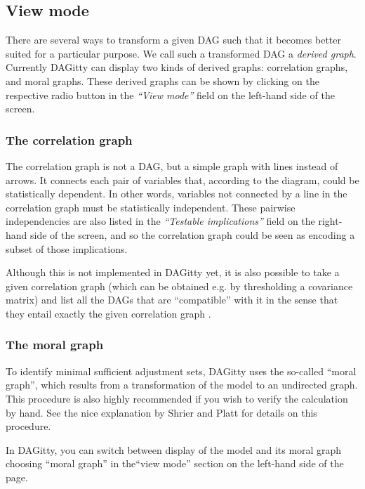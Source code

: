 \documentclass[a4paper]{article} %
\newcommand{\pp}{{\sc DAG}itty\xspace}
\newcommand{\action}[1]{\emph{``#1''}}
\begin{document}
\subsection{View mode}

There are several ways to transform a given DAG such that it becomes better suited for 
a particular purpose. We call such a transformed DAG a \emph{derived graph}. Currently
\pp can display two kinds of derived graphs: correlation graphs, and moral graphs.
These derived graphs can be shown by clicking on the respective radio button in the
\action{View mode} field on the left-hand side of the screen. 

\subsubsection{The correlation graph}

The correlation graph is not a DAG, but a simple graph with lines instead of arrows. 
It connects each pair of variables that, according to the diagram, could be statistically
dependent. In other words, variables not connected by a line in the correlation graph
must be statistically independent. These pairwise independencies are also listed in the
\action{Testable implications} field on the right-hand side of the screen, and so the
correlation graph could be seen as encoding a subset of those implications. 

Although this is not implemented in \pp yet, it is also possible to take a given 
correlation graph (which can be obtained e.g. by thresholding a covariance matrix) and 
list all the DAGs that are ``compatible'' with it in the sense that they entail exactly
the given correlation graph \cite{textor15_uai}.

\subsubsection{The moral graph}

To identify minimal sufficient adjustment sets, \pp uses the so-called ``moral graph'',
which results from a transformation of the model to an undirected graph.
This procedure is also highly recommended if you wish to verify the calculation by hand.
See the nice explanation by Shrier and Platt \cite{ShrierP2008} for details on this
procedure.  

In \pp, you can switch between display of the model and its moral graph 
choosing ``moral graph'' in the``view mode'' section on the left-hand
side of the page.
\end{document}
